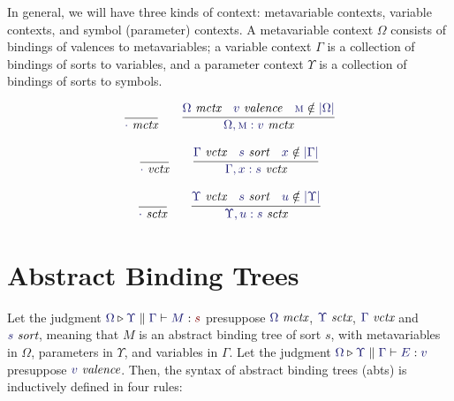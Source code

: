 \documentclass[11pt]{article}
\theoremstyle{definition}
\theoremstyle{remark}
\numberwithin{equation}{section}
\def\IModeColorName{MidnightBlue}
\def\OModeColorName{Maroon}
\newcommand\IMode[1]{{\color{\IModeColorName}{#1}}}
\newcommand\OMode[1]{{\color{\OModeColorName}{#1}}}
\newcommand\IsValence[1]{\IMode{#1}\ \textit{valence}}
\newcommand\IsSort[1]{\IMode{#1}\ \textit{sort}}
\newcommand\IsMetaCtx[1]{\IMode{#1}\ \textit{mctx}}
\newcommand\IsVarCtx[1]{\IMode{#1}\ \textit{vctx}}
\newcommand\IsSymCtx[1]{\IMode{#1}\ \textit{sctx}}
\newcommand\IsAbt[5]{%
  \IMode{#1}\triangleright%
  \IMode{#2}\parallel%
  \IMode{#3}\vdash%
  \IMode{#4}:\OMode{#5}%
}
\newcommand\IsBTm[5]{%
  \IMode{#1}\triangleright%
  \IMode{#2}\parallel%
  \IMode{#3}\vdash%
  \IMode{#4}:\IMode{#5}%
}
\newcommand\MV[1]{\textsc{#1}}
\newcommand\Dom[1]{\left\vert#1\right\vert}
\newcommand\NotIn[2]{\IMode{#1}\notin\IMode{#2}}
\begin{document}
In general, we will have three kinds of context: metavariable contexts,
variable contexts, and symbol (parameter) contexts. A metavariable context
$\Omega$ consists of bindings of valences to metavariables; a variable context
$\Gamma$ is a collection of bindings of sorts to variables, and a parameter
context $\Upsilon$ is a collection of bindings of sorts to symbols.

\begin{gather*}
  \infer{
    \IsMetaCtx{\cdot}
  }{
  }\qquad
  \infer{
    \IsMetaCtx{\Omega,\MV{m}:v}
  }{
    \IsMetaCtx{\Omega} &
    \IsValence{v} &
    \NotIn{\MV{m}}{\Dom\Omega}
  }
\end{gather*}

\begin{gather*}
  \infer{
    \IsVarCtx{\cdot}
  }{
  }\qquad
  \infer{
    \IsVarCtx{\Gamma,x:s}
  }{
    \IsVarCtx{\Gamma} &
    \IsSort{s} &
    \NotIn{x}{\Dom\Gamma}
  }
\end{gather*}

\begin{gather*}
  \infer{
    \IsSymCtx{\cdot}
  }{
  }\qquad
  \infer{
    \IsSymCtx{\Upsilon,u:s}
  }{
    \IsVarCtx{\Upsilon} &
    \IsSort{s} &
    \NotIn{u}{\Dom\Upsilon}
  }
\end{gather*}

\section{Abstract Binding Trees}

Let the judgment $\IsAbt{\Omega}{\Upsilon}{\Gamma}{M}{s}$ presuppose
$\IsMetaCtx{\Omega}$, $\IsSymCtx\Upsilon$, $\IsVarCtx\Gamma$ and $\IsSort{s}$,
meaning that $M$ is an abstract binding tree of sort $s$, with metavariables in
$\Omega$, parameters in $\Upsilon$, and variables in $\Gamma$. Let the judgment
$\IsBTm{\Omega}{\Upsilon}{\Gamma}{E}{v}$ presuppose $\IsValence{v}$.  Then, the
syntax of abstract binding trees (abts) is inductively defined in four rules:
\end{document}
